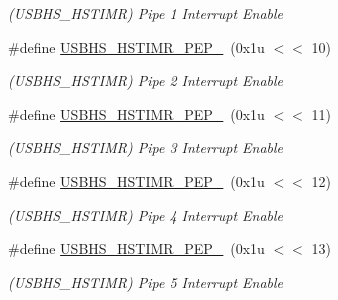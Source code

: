 \begin{DoxyCompactItemize}
\begin{DoxyCompactList}\small\item\em (U\+S\+B\+H\+S\+\_\+\+H\+S\+T\+I\+MR) Pipe 1 Interrupt Enable \end{DoxyCompactList}\item 
\mbox{\label{group__SAMV71__USBHS_ga9880b7c54d692247c9aba7f4f95c2e15}} 
\#define \mbox{\hyperlink{group__SAMV71__USBHS_ga9880b7c54d692247c9aba7f4f95c2e15}{U\+S\+B\+H\+S\+\_\+\+H\+S\+T\+I\+M\+R\+\_\+\+P\+E\+P\+\_}}~(0x1u $<$$<$ 10)
\begin{DoxyCompactList}\small\item\em (U\+S\+B\+H\+S\+\_\+\+H\+S\+T\+I\+MR) Pipe 2 Interrupt Enable \end{DoxyCompactList}\item 
\mbox{\label{group__SAMV71__USBHS_ga70b559fada4c465d2b6bc299392ae540}} 
\#define \mbox{\hyperlink{group__SAMV71__USBHS_ga70b559fada4c465d2b6bc299392ae540}{U\+S\+B\+H\+S\+\_\+\+H\+S\+T\+I\+M\+R\+\_\+\+P\+E\+P\+\_}}~(0x1u $<$$<$ 11)
\begin{DoxyCompactList}\small\item\em (U\+S\+B\+H\+S\+\_\+\+H\+S\+T\+I\+MR) Pipe 3 Interrupt Enable \end{DoxyCompactList}\item 
\mbox{\label{group__SAMV71__USBHS_ga26cb041dc277bbef3b58e0202ab628f8}} 
\#define \mbox{\hyperlink{group__SAMV71__USBHS_ga26cb041dc277bbef3b58e0202ab628f8}{U\+S\+B\+H\+S\+\_\+\+H\+S\+T\+I\+M\+R\+\_\+\+P\+E\+P\+\_}}~(0x1u $<$$<$ 12)
\begin{DoxyCompactList}\small\item\em (U\+S\+B\+H\+S\+\_\+\+H\+S\+T\+I\+MR) Pipe 4 Interrupt Enable \end{DoxyCompactList}\item 
\mbox{\label{group__SAMV71__USBHS_gaceb5d8500512986ef44bafafe5f5aaa5}} 
\#define \mbox{\hyperlink{group__SAMV71__USBHS_gaceb5d8500512986ef44bafafe5f5aaa5}{U\+S\+B\+H\+S\+\_\+\+H\+S\+T\+I\+M\+R\+\_\+\+P\+E\+P\+\_}}~(0x1u $<$$<$ 13)
\begin{DoxyCompactList}\small\item\em (U\+S\+B\+H\+S\+\_\+\+H\+S\+T\+I\+MR) Pipe 5 Interrupt Enable \end{DoxyCompactList}\item 

\end{DoxyCompactItemize}
